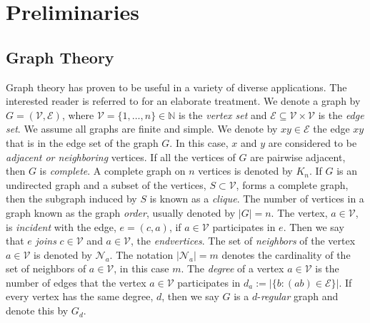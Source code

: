 \documentclass[reqno,8pt]{amsart}
\theoremstyle{definition}
\theoremstyle{remark}
\numberwithin{equation}{section}
\def\cV{\mathcal{V}}
\begin{document}
\section{Preliminaries} \label{sec:Prelim}
\subsection{Graph Theory}
Graph theory has proven to be useful in a variety of diverse applications. The interested reader is referred to \cite{God2001} for an elaborate treatment. We denote a graph by $G = (\mathcal{V},\mathcal{E})$, where $\mathcal{V} = \{1,\ldots, n\} \in \mathbb{N}$ is the \textit{vertex set} and $\mathcal{E} \subseteq \mathcal{V} \times \mathcal{V}$ is the \textit{edge set}. We assume all graphs are finite and simple.  We denote by $xy \in \mathcal{E}$ the edge $xy$ that is in the edge set of the graph $G$. In this case, $x$ and $y$ are considered to be \textit{adjacent or neighboring} vertices.  If all the vertices of $G$ are pairwise adjacent, then $G$ is \textit{complete}.  A complete graph on $n$ vertices is denoted by $K_n$.  If $G$ is an undirected graph and a subset of the vertices, $S \subset \cV$, forms a complete graph, then the subgraph induced by $S$ is known as a \textit{clique}. The number of vertices in a graph known as the graph \textit{order}, usually denoted by $|G|=n$. The vertex, $a \in \cV$, is \textit{incident} with the edge, $e=(c,a)$, if $a \in \cV$ participates in $e$.  Then we say that $e$ \textit{joins} $c \in \cV$ and $a \in \cV$, the \textit{endvertices}.  The set of \textit{neighbors} of the vertex $a \in \cV$ is denoted by $\mathcal{N}_a$. The notation $|\mathcal{N}_a|=m$ denotes the cardinality of the set of neighbors of $a \in \cV$, in this case $m$. The \textit{degree} of a vertex $a \in \cV$ is the number of edges that the vertex $a \in \cV$ participates in $d_a := |\{b: (ab) \in \mathcal{E}\}|$. If every vertex has the same degree, $d$, then we say $G$ is a $d$-\textit{regular} graph and denote this by $G_d$. 
\end{document}
